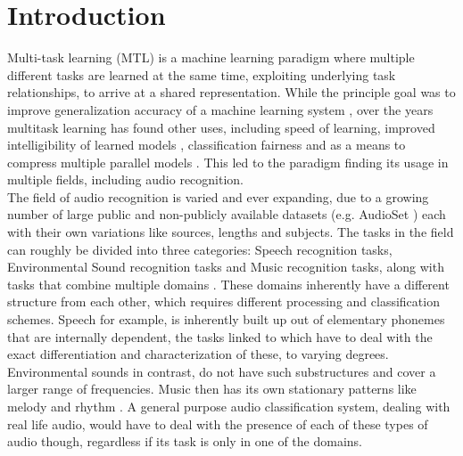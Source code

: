 \chapter{Introduction}

Multi-task learning (MTL) is a machine learning paradigm where multiple different tasks are learned at the same time, exploiting underlying task relationships, to arrive at a shared representation. While the principle goal was to improve generalization accuracy of a machine learning system \citep{caruana1997multitask}, over the years multitask learning has found other uses, including speed of learning, improved intelligibility of learned models \citep{caruana1997multitask}, classification fairness \citep{oneto2019taking} and as a means to compress multiple parallel models \citep{georgiev2017heterogeneous}. This led to the paradigm finding its usage in multiple fields, including audio recognition.\\

The field of audio recognition is varied and ever expanding, due to a growing number of large public and non-publicly available datasets (e.g. AudioSet \citep{gemmeke2017audio}) each with their own variations like sources, lengths and subjects. The tasks in the field can roughly be divided into three categories: Speech recognition tasks, Environmental Sound recognition tasks and Music recognition tasks, along with tasks that combine multiple domains \citep{duan2014survey}. These domains inherently have a different structure from each other, which requires different processing and classification schemes. Speech for example, is inherently built up out of elementary phonemes that are internally dependent, the tasks linked to which have to deal with the exact differentiation and characterization of these, to varying degrees. Environmental sounds in contrast, do not have such substructures and cover a larger range of frequencies. Music then has its own stationary patterns like melody and rhythm \citep{boregowda2018environmental}. A general purpose audio classification system, dealing with real life audio, would have to deal with the presence of each of these types of audio though, regardless if its task is only in one of the domains.\\    


